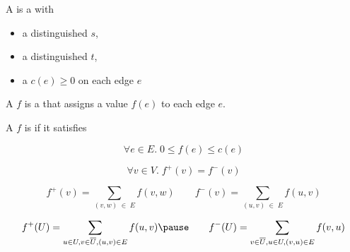 
\begin{frame}{}
  \begin{definition}[Network (网络)]
    A  is a  with
    \begin{itemize}
      \setlength{\itemsep}{5pt}
      \item a distinguished  $s$,
      \item a distinguished  $t$,
      \item a  $c(e) \ge 0$ on each edge $e$
    \end{itemize}
  \end{definition}

  \vspace{0.30cm}
\end{frame}

\begin{frame}{}
  \begin{definition}[Flow (流)]
    A  $f$ is a  that assigns a value $f(e)$ to each edge $e$.
  \end{definition}

  \vspace{0.30cm}
\end{frame}

\begin{frame}{}
  \begin{definition}
    A  $f$ is  if it satisfies
    \begin{description}
      \item[Capacity Constraints:]
        \[
          \forall e \in E.\; 0 \le f(e) \le c(e)
        \]
      \item[Flow Conservation:]
        \[
          \forall v \in V.\; f^{+}(v) = f^{-}(v)
        \]
    \end{description}
  \end{definition}

\end{frame}

\begin{frame}{}
  \[
    f^{+}(v) = \sum_{(v, w) \;\in\; E} f(v, w) \qquad
    f^{-}(v) = \sum_{(u, v) \;\in\; E} f(u, v)
  \]


  \pause
  \[
    f^{+}(U) = \sum_{u \in U, v \in \overline{U}, (u, v) \in E} f(u, v) \pause\qquad
    f^{-}(U) = \sum_{v \in \overline{U}, u \in U, (v, u) \in E} f(v, u)
  \]
\end{frame}

